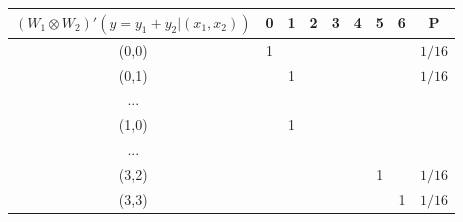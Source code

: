 \begin{tabular}{c|c|c|c|c|c|c|c||c|}
$(W_1 \otimes W_2)\prime( y =y_1 + y_2 | (x_1, x_2))$ & 0 & 1 & 2 & 3 & 4 & 5 & 6 & P      \\ \hline
(0,0)             & 1 &   &   &   &   &   &   & $1/16$ \\ \hline
(0,1)             &   & 1 &   &   &   &   &   & $1/16$ \\ \hline
...               &   &   &   &   &   &   &   &        \\ \hline
(1,0)             &  & 1 &   &   &   &   &   &        \\ \hline
...               &   &   &   &   &   &   &   &        \\ \hline
(3,2)             &   &   &   &   &   & 1 &   & $1/16$ \\ \hline
(3,3)             &   &   &   &   &   &   & 1 & $1/16$ \\ \hline
\end{tabular}